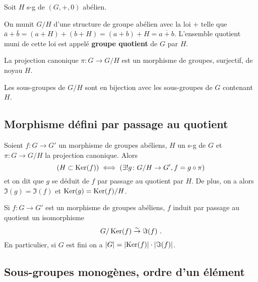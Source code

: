 	Soit $H$ s-g de $(G,+,0)$ abélien.

	\begin{lem}
		On munit $G/H$ d'une structure de groupe abélien avec la loi $+$ telle que $\bar{a} + \bar{b} = (a + H) + (b + H) = (a + b) + H = \overline{a + b}$.
		L'ensemble quotient muni de cette loi est appelé \textbf{groupe quotient} de $G$ par $H$.
	\end{lem}

	
	\begin{pop}
		La projection canonique $\pi \colon G \to G/H$ est un morphisme de groupes, surjectif, de noyau $H$.
	\end{pop}

	\begin{thm}
		Les sous-groupes de $G/H$ sont en bijection avec les sous-groupes de $G$ contenant $H$.
	\end{thm}


\subsection{Morphisme défini par passage au quotient}

	\begin{thm}[de factorisation]
		Soient $f \colon G \to G'$ un morphisme de groupes abéliens, $H$ un s-g de $G$ et $\pi \colon G \to G/H$ la projection canonique.
		Alors
		$$\left( H \subset \operatorname{Ker}(f) \right) \iff \left( \exists ! g \colon G/H \to G', f = g \circ \pi \right)$$
		et on dit que $g$ se déduit de $f$ par passage au quotient par $H$.
		De plus, on a alors $\Im(g) = \Im(f)$ et $\operatorname{Ker}(g) = \operatorname{Ker}(f)/H$.
	\end{thm}

	\begin{cor}
		Si $f \colon G \to G'$ est un morphisme de groupes abéliens, $f$ induit par passage au quotient un isomorphisme
		$$G/\operatorname{Ker}(f) \overset{\sim}{\to} \Im(f)\ .$$
		En particulier, si $G$ est fini on a $\left\lvert G\right\rvert = \left\lvert\operatorname{Ker}(f)\right\rvert \cdot \left\lvert\Im(f)\right\rvert$.
	\end{cor}


\subsection{Sous-groupes monogènes, ordre d'un élément}

